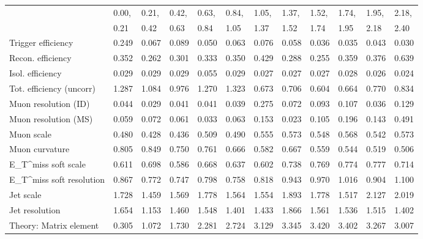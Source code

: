 \begin{tabular}{l|p{0.6cm}p{0.6cm}p{0.6cm}p{0.6cm}p{0.6cm}p{0.6cm}p{0.6cm}p{0.6cm}p{0.6cm}p{0.6cm}p{0.6cm}}
\hline
   & 0.00, & 0.21, & 0.42, & 0.63, & 0.84, & 1.05, & 1.37, & 1.52, & 1.74, & 1.95, & 2.18,  \\ 
   & 0.21 & 0.42 & 0.63 & 0.84 & 1.05 & 1.37 & 1.52 & 1.74 & 1.95 & 2.18 & 2.40  \\ 
\hline
Trigger efficiency                       & 0.249 & 0.067 & 0.089 & 0.050 & 0.063 & 0.076 & 0.058 & 0.036 & 0.035 & 0.043 & 0.030 \\
Recon. efficiency                        & 0.352 & 0.262 & 0.301 & 0.333 & 0.350 & 0.429 & 0.288 & 0.255 & 0.359 & 0.376 & 0.639 \\
Isol. efficiency                         & 0.029 & 0.029 & 0.029 & 0.055 & 0.029 & 0.027 & 0.027 & 0.027 & 0.028 & 0.026 & 0.024 \\
Tot. efficiency (uncorr)                 & 1.287 & 1.084 & 0.976 & 1.270 & 1.323 & 0.673 & 0.706 & 0.604 & 0.664 & 0.770 & 0.834 \\
Muon resolution (ID)                     & 0.044 & 0.029 & 0.041 & 0.041 & 0.039 & 0.275 & 0.072 & 0.093 & 0.107 & 0.036 & 0.129 \\
Muon resolution (MS)                     & 0.059 & 0.072 & 0.061 & 0.033 & 0.063 & 0.153 & 0.023 & 0.105 & 0.196 & 0.143 & 0.491 \\
Muon scale                               & 0.480 & 0.428 & 0.436 & 0.509 & 0.490 & 0.555 & 0.573 & 0.548 & 0.568 & 0.542 & 0.573 \\
Muon curvature                           & 0.805 & 0.849 & 0.750 & 0.761 & 0.666 & 0.582 & 0.667 & 0.559 & 0.544 & 0.519 & 0.506 \\
E_{T}^{miss} soft scale                  & 0.611 & 0.698 & 0.586 & 0.668 & 0.637 & 0.602 & 0.738 & 0.769 & 0.774 & 0.777 & 0.714 \\
E_{T}^{miss} soft resolution             & 0.867 & 0.772 & 0.747 & 0.798 & 0.758 & 0.818 & 0.943 & 0.970 & 1.016 & 0.904 & 1.100 \\
Jet scale                                & 1.728 & 1.459 & 1.569 & 1.778 & 1.564 & 1.554 & 1.893 & 1.778 & 1.517 & 2.127 & 2.019 \\
Jet resolution                           & 1.654 & 1.153 & 1.460 & 1.548 & 1.401 & 1.433 & 1.866 & 1.561 & 1.536 & 1.515 & 1.402 \\
Theory: Matrix element                   & 0.305 & 1.072 & 1.730 & 2.281 & 2.724 & 3.129 & 3.345 & 3.420 & 3.402 & 3.267 & 3.007 \\

\end{tabular}

